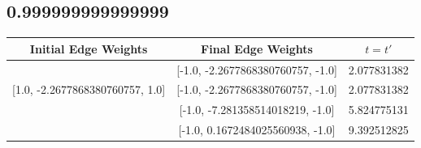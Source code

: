 \documentclass[aps]{revtex4-2}
\begin{document}
\subsection{0.999999999999999}
\begin{center}
    \begin{tabular}{||c c c||}
        \hline
        Initial Edge Weights&Final Edge Weights&$t=t'$\\
        \hline
        [1.0, -2.2677868380760757, 1.0]&[-1.0, -2.2677868380760757, -1.0]&2.077831382\\

        [1.0, -2.2677868380760757, 1.0]&[-1.0, -2.2677868380760757, -1.0]&2.077831382\\
        \hline
        [1.0, -7.281358514018219, 1.0]&[-1.0, -7.281358514018219, -1.0]&5.824775131\\
        \hline
        [1.0, 0.1672484025560938, 1.0]&[-1.0, 0.1672484025560938, -1.0]&9.392512825\\
        \hline
    \end{tabular}
\end{center}
\end{document}
